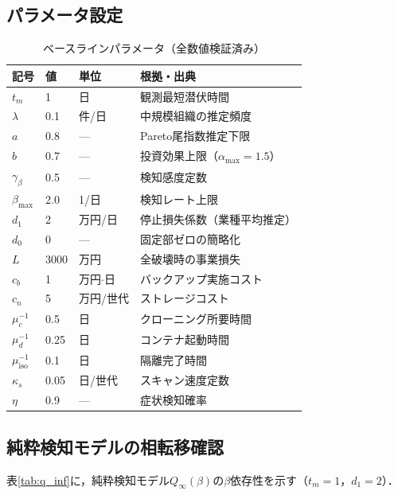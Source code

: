 \documentclass[12pt,a4paper]{article}
\theoremstyle{plain}
\theoremstyle{definition}
\theoremstyle{remark}
\newcommand{\Qinf}{Q_{\infty}}
\begin{document}
\subsection{パラメータ設定}

\begin{table}[h]
\centering
\caption{ベースラインパラメータ（全数値検証済み）}
\label{tab:params}
\begin{tabular}{@{}lllp{55mm}@{}}
\toprule
記号 & 値 & 単位 & 根拠・出典 \\
\midrule
$t_m$ & 1 & 日 & 観測最短潜伏時間~\cite{mandiant2023} \\
$\lambda$ & 0.1 & 件/日 & 中規模組織の推定頻度 \\
$a$ & 0.8 & --- & Pareto尾指数推定下限 \\
$b$ & 0.7 & --- & 投資効果上限（$\alpha_{\max}=1.5$）\\
$\gamma_\beta$ & 0.5 & --- & 検知感度定数 \\
$\beta_{\max}$ & 2.0 & 1/日 & 検知レート上限 \\
$d_1$ & 2 & 万円/日 & 停止損失係数（業種平均推定）\\
$d_0$ & 0 & --- & 固定部ゼロの簡略化 \\
$L$ & 3000 & 万円 & 全破壊時の事業損失 \\
$c_b$ & 1 & 万円$\cdot$日 & バックアップ実施コスト \\
$c_n$ & 5 & 万円/世代 & ストレージコスト \\
$\mu_c^{-1}$ & 0.5 & 日 & クローニング所要時間 \\
$\mu_d^{-1}$ & 0.25 & 日 & コンテナ起動時間 \\
$\mu_{\mathrm{iso}}^{-1}$ & 0.1 & 日 & 隔離完了時間 \\
$\kappa_s$ & 0.05 & 日/世代 & スキャン速度定数 \\
$\eta$ & 0.9 & --- & 症状検知確率 \\
\bottomrule
\end{tabular}
\end{table}

\subsection{純粋検知モデルの相転移確認}

表\ref{tab:q_inf}に，純粋検知モデル$\Qinf(\beta)$の$\beta$依存性を示す（$t_m=1$，$d_1=2$）．
\end{document}
